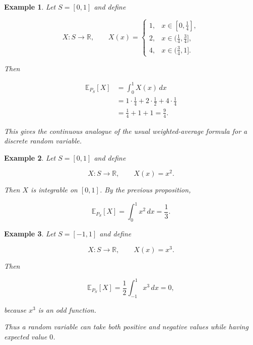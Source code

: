 \documentclass[10pt,a4paper]{book}
\newtheorem{example}{Example}[section]
\begin{document}
\begin{example}

    Let $S=[0,1]$ and define

    $$
        X:S\to\mathbb R,
        \qquad
        X(x)=
        \begin{cases}
            1, & x\in[0,\frac14],       \\
            2, & x\in(\frac14,\frac34], \\
            4, & x\in(\frac34,1].
        \end{cases}
    $$

    Then

    $$
        \begin{aligned}
            \mathbb E_{P_S}[X]
             & =
            \int_0^1X(x)\,dx \\
             & =
            1\cdot\frac14
            +
            2\cdot\frac12
            +
            4\cdot\frac14    \\
             & =
            \frac14+1+1
            =
            \frac94.
        \end{aligned}
    $$

    This gives the continuous analogue of the usual weighted-average formula for a discrete random variable.
\end{example}

\begin{example}

    Let $S=[0,1]$ and define

    $$
        X:S\to\mathbb R,
        \qquad
        X(x)=x^2.
    $$

    Then $X$ is integrable on $[0,1]$. By the previous proposition,

    $$
        \mathbb E_{P_S}[X]
        =
        \int_0^1x^2\,dx
        =
        \frac13.
    $$

\end{example}

\begin{example}

    Let $S=[-1,1]$ and define

    $$
        X:S\to\mathbb R,
        \qquad
        X(x)=x^3.
    $$

    Then

    $$
        \mathbb E_{P_S}[X]
        =
        \frac12\int_{-1}^1x^3\,dx
        =
        0,
    $$

    because $x^3$ is an odd function.

    Thus a random variable can take both positive and negative values while having expected value $0$.

\end{example}
\end{document}
